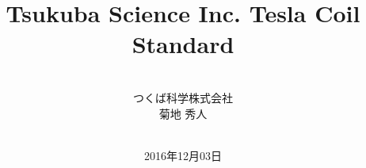 \documentclass[a4paper,10pt]{jsarticle}
\begin{document}
\title{Tsukuba Science Inc. Tesla Coil Standard}
\author{\vspace*{20mm}\ \\つくば科学株式会社\\菊地 秀人}
\date{\vspace*{20mm}\ \\2016年12月03日}
\maketitle
\end{document}

